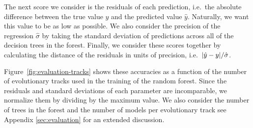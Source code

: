 The next score we consider is the residuals of each prediction, i.e.\ the absolute difference between the true value $y$ and the predicted value $\hat y$. Naturally, we want this value to be as low as possible. We also consider the precision of the regression $\hat \sigma$ by taking the standard deviation of predictions across all of the decision trees in the forest. Finally, we consider these scores together by calculating the distance of the residuals in units of precision, i.e.\ ${\abs{\hat y - y} / \hat{\sigma}}$. 

Figure~\ref{fig:evaluation-tracks} shows these accuracies as a function of the number of evolutionary tracks used in the training of the random forest. Since the residuals and standard deviations of each parameter are incomparable, we normalize them by dividing by the maximum value. We also consider the number of trees in the forest and the number of models per evolutionary track see Appendix \ref{sec:evaluation} for an extended discussion. 

